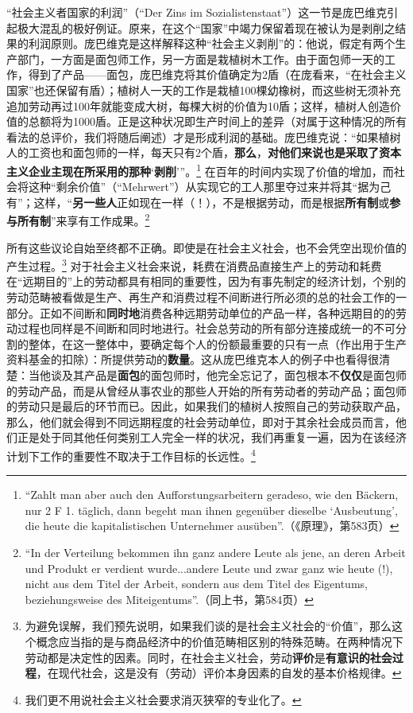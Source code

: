 \documentclass[fontset=fandol, a4paper, 12pt, openright]{ctexbook}
\begin{document}
“社会主义者国家的利润”（“Der Zins im Sozialistenstaat”）这一节是庞巴维克引起极大混乱的极好例证。原来，在这个“国家”中竭力保留着现在被认为是剥削之结果的利润原则。庞巴维克是这样解释这种“社会主义剥削”的：他说，假定有两个生产部门，一方面是面包师工作，另一方面是栽植树木工作。由于面包师一天的工作，得到了产品——面包，庞巴维克将其价值确定为2盾（在庞看来，“在社会主义国家”也还保留有盾）；植树人一天的工作是栽植100棵幼橡树，而这些树无须补充追加劳动再过100年就能变成大树，每棵大树的价值为10盾；这样，植树人创造价值的总额将为1000盾。正是这种状况即生产时间上的差异（对属于这种情况的所有看法的总评价，我们将随后阐述）才是形成利润的基础。庞巴维克说：“如果植树人的工资也和面包师的一样，每天只有2个盾，\textbf{那么}，\textbf{对他们来说也是采取了资本主义企业主现在所采用的那种}‘\textbf{剥削}’”。\footnote{``Zahlt man aber auch den Aufforstungsarbeitern geradeso, wie den B\"{a}ckern, nur 2 F 1. t\"{a}glich, dann begeht man ihnen gegen\"{u}ber dieselbe `Ausbeutung', die heute die kapitalistischen Unternehmer aus\"{u}ben''.（《原理》，第583页）} 在百年的时间内实现了价值的增加，而社会将这种“剩余价值”（“Mehrwert”）从实现它的工人那里夺过来并将其“据为己有”；这样，“\textbf{另一些人}正如现在一样（！），不是根据劳动，而是根据\textbf{所有制}或\textbf{参与所有制}”来享有工作成果。\footnote{``In der Verteilung bekommen ihn ganz andere Leute als jene, an deren Arbeit und Produkt er verdient wurde...andere Leute und zwar ganz wie heute (!), nicht aus dem Titel der Arbeit, sondern aus dem Titel des Eigentums, beziehungsweise des Miteigentums''.（同上书，第584页）}

所有这些议论自始至终都不正确。即使是在社会主义社会，也不会凭空出现价值的产生过程。\footnote{为避免误解，我们预先说明，如果我们谈的是社会主义社会的“价值”，那么这个概念应当指的是与商品经济中的价值范畴相区别的特殊范畴。在两种情况下劳动都是决定性的因素。同时，在社会主义社会，劳动\textbf{评价}是\textbf{有意识的社会过程}，在现代社会，这是没有（劳动）评价本身因素的自发的基本价格规律。} 对于社会主义社会来说，耗费在消费品直接生产上的劳动和耗费在“远期目的”上的劳动都具有相同的重要性，因为有事先制定的经济计划，个别的劳动范畴被看做是生产、再生产和消费过程不间断进行所必须的总的社会工作的一部分。正如不间断和\textbf{同时地}消费各种远期劳动单位的产品一样，各种远期目的的劳动过程也同样是不间断和同时地进行。社会总劳动的所有部分连接成统一的不可分割的整体，在这一整体中，要确定每个人的份额最重要的只有一点（作出用于生产资料基金的扣除）：所提供劳动的\textbf{数量}。这从庞巴维克本人的例子中也看得很清楚：当他谈及其产品是\textbf{面包}的面包师时，他完全忘记了，面包根本不\textbf{仅仅}是面包师的劳动产品，而是从曾经从事农业的那些人开始的所有劳动者的劳动产品；面包师的劳动只是最后的环节而已。因此，如果我们的植树人按照自己的劳动获取产品，那么，他们就会得到不同远期程度的社会劳动单位，即对于其余社会成员而言，他们正是处于同其他任何类别工人完全一样的状况，我们再重复一遍，因为在该经济计划下工作的重要性不取决于工作目标的长远性。\footnote{我们更不用说社会主义社会要求消灭狭窄的专业化了。}
\end{document}
